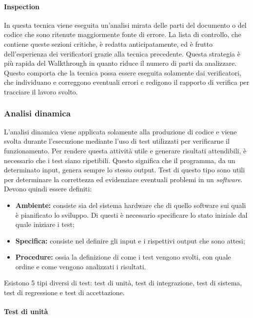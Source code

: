 \paragraph{Inspection}
In questa tecnica viene eseguita un'analisi mirata delle parti del documento o 
del codice che sono ritenute maggiormente fonte di errore. La lista di 
controllo, che contiene queste sezioni critiche, è redatta anticipatamente, ed 
è frutto dell'esperienza dei verificatori grazie alla tecnica 
precedente.\newline
Questa strategia è più rapida del Walkthrough in quanto riduce il numero di 
parti da analizzare. Questo comporta che la tecnica possa essere eseguita 
solamente dai verificatori, che individuano e correggono eventuali errori e 
redigono il rapporto di verifica per tracciare il lavoro svolto.

\subsubsection{Analisi dinamica}
L'analisi dinamica viene applicata solamente alla produzione di codice e viene svolta durante l'esecuzione mediante l'uso di test utilizzati per verificarne il funzionamento. \newline
Per rendere questa attività utile e generare risultati attendibili, è 
necessario che i test siano ripetibili. Questo significa che il programma, da 
un determinato input, genera sempre lo stesso output. Test di questo tipo sono 
utili per determinare la correttezza ed evidenziare eventuali problemi in un 
\textit{software}. Devono quindi essere definiti:
\begin{itemize}
	\item \textbf{Ambiente:} consiste sia del sistema hardware che di quello software sui quali è pianificato lo sviluppo. Di questi è necessario specificare lo stato iniziale dal quale iniziare i test;
	\item \textbf{Specifica:} consiste nel definire gli input e i rispettivi output che sono attesi;
	\item \textbf{Procedure:} ossia la definizione di come i test vengono svolti, con quale ordine e come vengono analizzati i risultati.
\end{itemize}
Esistono 5 tipi diversi di test: test di unità, test di integrazione, test di sistema, test di regressione e test di accettazione.

\paragraph{Test di unità}

